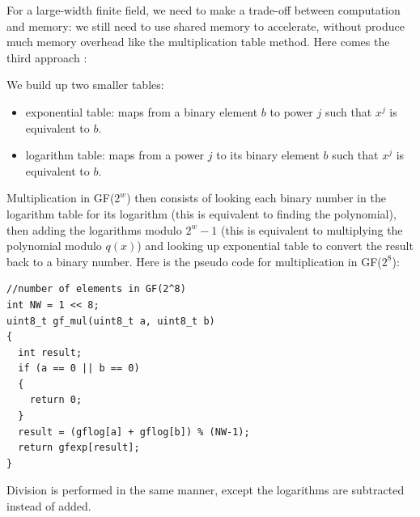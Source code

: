 \documentclass[a4paper]{article}
\begin{document}
For a large-width finite field, 
we need to make a trade-off between computation and memory: 
we still need to use shared memory to accelerate,
without produce much memory overhead like the multiplication table method.
Here comes the third approach \cite{plank1997tutorial}:




%

We build up two smaller tables:
\begin{itemize}
  \item exponential table: maps from a binary element $b$ to power $j$ such that $x^j$ is equivalent to $b$.
  \item logarithm table: maps from a power $j$ to its binary element $b$ such that $x^j$ is equivalent to $b$.
\end{itemize}
Multiplication in GF($2^w$) then consists of 
looking each binary number in the logarithm table for its logarithm (this is equivalent to finding the polynomial), 
then adding the logarithms modulo $2^w-1$ (this is equivalent to multiplying the polynomial modulo $q(x)$) 
and 
looking up exponential table to convert the result back to a binary number.
Here is the pseudo code for multiplication in GF($2^8$):
\begin{verbatim}
//number of elements in GF(2^8)
int NW = 1 << 8;
uint8_t gf_mul(uint8_t a, uint8_t b)
{
  int result;
  if (a == 0 || b == 0)
  {
    return 0;
  }
  result = (gflog[a] + gflog[b]) % (NW-1);
  return gfexp[result];
}
\end{verbatim}
Division is performed in the same manner, except the logarithms are subtracted instead of added.
\end{document}
